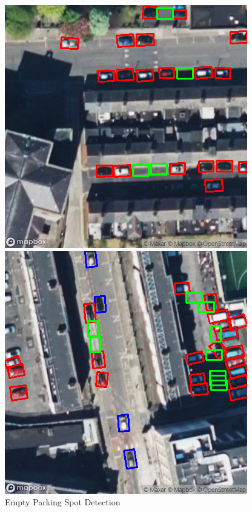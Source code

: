 \begin{figure}[htbp]
\begin{minipage}{0.45\textwidth}
  \end{minipage}
  \hfill
  \begin{minipage}{0.45\textwidth}
    \centering
    \includegraphics[width=\textwidth]{images/empty_parking3.png}
  \end{minipage}
  \hfill
  \begin{minipage}{0.45\textwidth}
    \centering
    \includegraphics[width=\textwidth]{images/empty_parking4.png}
  \end{minipage}
  \caption{Empty Parking Spot Detection}
  \label{fig:Empty_parking_detection}
\end{figure}

